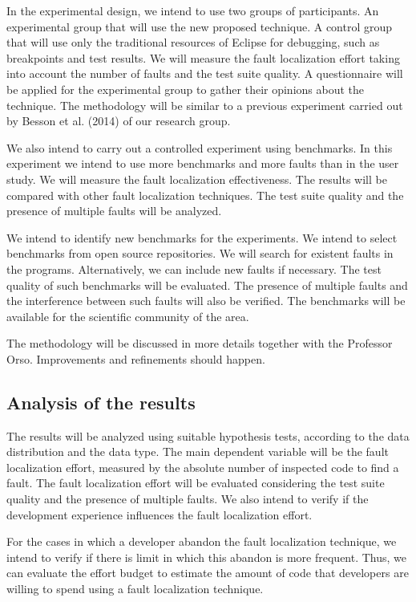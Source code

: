 \documentclass[12pt,a4paper,espaco=umemeio,noindentfirst,oneside,openany,tocpage=plain,pnumromarab,ruledheader,time,anapcustomindent]{sty/abnt}
\begin{document}
In the experimental design, we intend to use two groups of participants. An experimental group that will use the new proposed 
technique. A control group that will use only the traditional resources of Eclipse for debugging, such as breakpoints and 
test results. We will measure the fault localization effort taking into account the number of faults and the test suite quality. 
A questionnaire will be applied for the experimental group to gather their opinions about the technique. The methodology will be 
similar to a previous experiment carried out by Besson et al. (2014) \cite{besson2014} of our research group.

We also intend to carry out a controlled experiment using benchmarks. In this experiment we intend to use more benchmarks and 
more faults than in the user study. We will measure the fault localization effectiveness. The results will be compared with 
other fault localization techniques. The test suite quality and the presence of multiple faults will be analyzed.

We intend to identify new benchmarks for the experiments. We intend to select benchmarks from open source repositories. 
We will search for existent faults in the programs. Alternatively, we can include new faults if necessary.
The test quality of such benchmarks will be evaluated. The presence of multiple faults and the interference between such 
faults will also be verified. The benchmarks will be available for the scientific community of the area.

The methodology will be discussed in more details together with the Professor Orso. Improvements and refinements 
should happen.


\subsection{Analysis of the results}
\label{analysis}

The results will be analyzed using suitable hypothesis tests, according to the data distribution and the data type.
The main dependent variable will be the fault localization effort, measured by the absolute number of inspected code to 
find a fault. The fault localization effort will be evaluated considering the test suite quality and the presence of multiple faults. 
We also intend to verify if the development experience influences the fault localization effort.

For the cases in which a developer abandon the fault localization technique, we intend to verify if there is limit in which this abandon 
is more frequent. Thus, we can evaluate the effort budget to estimate the amount of code that developers are willing to spend using a 
fault localization technique.
\end{document}
